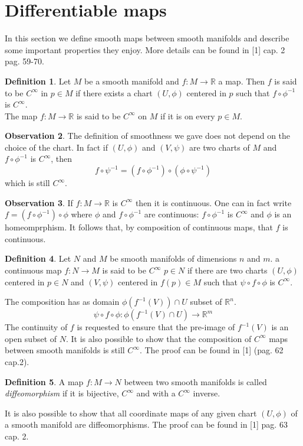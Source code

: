 \documentclass[12pt,a4paper]{report}
\theoremstyle{definition}
\newtheorem{Def}{Definition}[chapter]
\theoremstyle{Theorem}
\theoremstyle{definition}
\theoremstyle{definition}
\newtheorem{Obs}[Def]{Observation}
\begin{document}
	\section{Differentiable maps}
	In this section we define smooth maps between smooth manifolds and describe some important properties they enjoy. More details can be found in [1] cap. 2 pag. 59-70.
	\begin{Def}
		Let $M$ be a smooth manifold and $f:M\rightarrow\mathbb{R}$ a map. Then $f$ is said to be $C^\infty$ in $p\in M$ if there exists a chart $(U,\phi)$ centered in $p$ such that $f\circ \phi^{-1}$ is $C^\infty$.\\
		The map $f:M\rightarrow \mathbb{R}$ is said to be $C^\infty$ on $M$ if it is on every $p\in M$.
	\end{Def}
	\begin{Obs}
		The definition of smoothness we gave does not depend on the choice of the chart. In fact if $(U,\phi)$ and $(V,\psi)$ are two charts of $M$ and $f\circ\phi^{-1}$ is $C^\infty$, then $$f\circ\psi^{-1}=(f\circ\phi^{-1})\circ(\phi\circ\psi^{-1})$$ which is still $C^\infty$.
	\end{Obs}
	\begin{Obs}
		If $f:M\rightarrow \mathbb{R}$ is $C^\infty$ then it is continuous. One can in fact write $f=(f\circ\phi^{-1})\circ \phi$ where $\phi$ and $f\circ\phi^{-1}$ are continuous: $f\circ\phi^{-1}$ is $C^\infty$ and $\phi$ is an homeomprphism. It follows that, by composition of continuous maps, that $f$ is continuous.\\
	\end{Obs}
	\begin{Def}
		Let $N$ and $M$ be smooth manifolds of dimensions $n$ and $m$. a continuous map $f:N\rightarrow M$ is said to be $C^\infty$  $p\in N$ if there are two charts $(U,\phi)$ centered in $p\in N$ and $(V,\psi)$ centered in $f(p)\in M$ such that $\psi\circ f\circ \phi$ is $C^\infty$.
	\end{Def}
	The composition has as domain $\phi(f^{-1}(V))\cap U$ subset of $\mathbb{R}^n$. $$\psi\circ f\circ \phi:\phi(f^{-1}(V)\cap U)\rightarrow \mathbb{R}^m$$
	The continuity of $f$ is requested to ensure that the pre-image of $f^{-1}(V)$ is an open subset of $N$. It is also possible to show that the composition of $C^\infty$ maps between smooth manifolds is still $C^\infty$. The proof can be found in [1] (pag. 62 cap.2). 
	\begin{Def}
		A map $f:M\rightarrow N$ between two smooth manifolds is called \textit{diffeomorphism} if it is bijective, $C^\infty$ and with a $C^\infty$ inverse.
	\end{Def}
	It is also possible to show that all coordinate maps of any given chart $(U,\phi)$ of a smooth manifold are diffeomorphisms. The proof can be found in [1] pag. 63 cap. 2.
\end{document}
